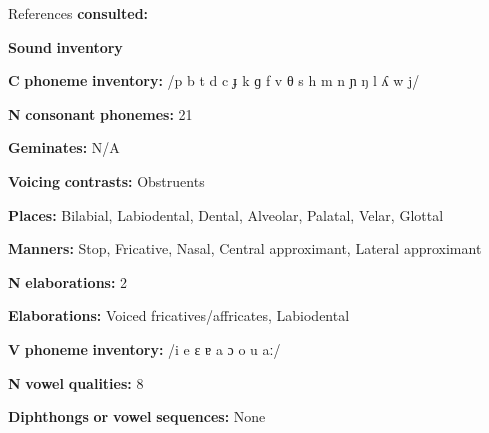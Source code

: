 \begin{styleBody}
References \textbf{consulted:} \citet{Clark2008}
\end{styleBody}

\begin{styleBody}
\textbf{Sound} \textbf{inventory}
\end{styleBody}

\begin{styleBody}
\textbf{C} \textbf{phoneme} \textbf{inventory:} /p b t d c ɟ k ɡ f v θ s h m n ɲ ŋ l ʎ w j/
\end{styleBody}

\begin{styleBody}
\textbf{N} \textbf{consonant} \textbf{phonemes:} 21
\end{styleBody}

\begin{styleBody}
\textbf{Geminates:} N/A
\end{styleBody}

\begin{styleBody}
\textbf{Voicing} \textbf{contrasts:} Obstruents
\end{styleBody}

\begin{styleBody}
\textbf{Places:} Bilabial, Labiodental, Dental, Alveolar, Palatal, Velar, Glottal
\end{styleBody}

\begin{styleBody}
\textbf{Manners:} Stop, Fricative, Nasal, Central approximant, Lateral approximant
\end{styleBody}

\begin{styleBody}
\textbf{N} \textbf{elaborations:} 2
\end{styleBody}

\begin{styleBody}
\textbf{Elaborations:} Voiced fricatives/affricates, Labiodental
\end{styleBody}

\begin{styleBody}
\textbf{V} \textbf{phoneme} \textbf{inventory:} /i e ɛ ɐ a ɔ o u aː/
\end{styleBody}

\begin{styleBody}
\textbf{N} \textbf{vowel} \textbf{qualities:} 8
\end{styleBody}

\begin{styleBody}
\textbf{Diphthongs} \textbf{or} \textbf{vowel} \textbf{sequences:} None
\end{styleBody}

